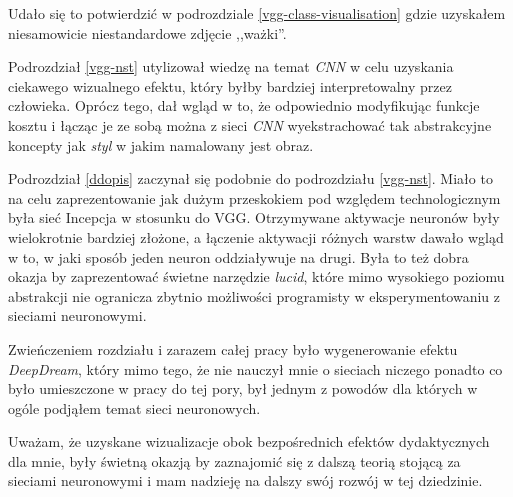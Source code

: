 Udało się to potwierdzić w podrozdziale \ref{vgg-class-visualisation} gdzie uzyskałem niesamowicie niestandardowe zdjęcie ,,ważki''. 

Podrozdział \ref{vgg-nst} utylizował wiedzę na temat \textit{CNN} w celu uzyskania ciekawego wizualnego efektu, który byłby bardziej interpretowalny przez człowieka. Oprócz tego, dał wgląd w to, że odpowiednio modyfikując funkcje kosztu i łącząc je ze sobą można z sieci \textit{CNN} wyekstrachować tak abstrakcyjne koncepty jak \textit{styl} w jakim namalowany jest obraz.

Podrozdział \ref{ddopis} zaczynał się podobnie do podrozdziału \ref{vgg-nst}. Miało to na celu zaprezentowanie jak dużym przeskokiem pod względem technologicznym była sieć Incepcja w stosunku do VGG. Otrzymywane aktywacje neuronów były wielokrotnie bardziej złożone, a łączenie aktywacji różnych warstw dawało wgląd w to, w jaki sposób jeden neuron oddziaływuje na drugi. Była to też dobra okazja by zaprezentować świetne narzędzie \textit{lucid}, które mimo wysokiego poziomu abstrakcji nie
ogranicza zbytnio możliwości programisty w eksperymentowaniu z sieciami neuronowymi.

Zwieńczeniem rozdziału i zarazem całej pracy było wygenerowanie efektu \textit{DeepDream}, który mimo tego, że nie nauczył mnie o sieciach niczego ponadto co było umieszczone w pracy do tej pory, był jednym z powodów dla których w ogóle podjąłem temat sieci neuronowych.

Uważam, że uzyskane wizualizacje obok bezpośrednich efektów dydaktycznych dla mnie, były świetną okazją by zaznajomić się z dalszą teorią stojącą za sieciami neuronowymi i mam nadzieję na dalszy swój rozwój w tej dziedzinie.
